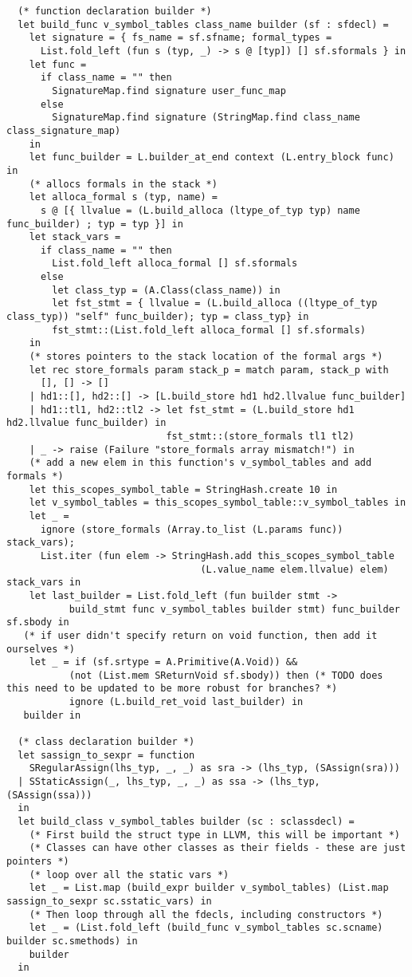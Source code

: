 \documentclass{article}
\begin{document}
\begin{verbatim}
  (* function declaration builder *)
  let build_func v_symbol_tables class_name builder (sf : sfdecl) =
    let signature = { fs_name = sf.sfname; formal_types =
      List.fold_left (fun s (typ, _) -> s @ [typ]) [] sf.sformals } in
    let func =
      if class_name = "" then
        SignatureMap.find signature user_func_map
      else
        SignatureMap.find signature (StringMap.find class_name class_signature_map)
    in
    let func_builder = L.builder_at_end context (L.entry_block func) in
    (* allocs formals in the stack *)
    let alloca_formal s (typ, name) = 
      s @ [{ llvalue = (L.build_alloca (ltype_of_typ typ) name func_builder) ; typ = typ }] in
    let stack_vars =
      if class_name = "" then
        List.fold_left alloca_formal [] sf.sformals
      else
        let class_typ = (A.Class(class_name)) in
        let fst_stmt = { llvalue = (L.build_alloca ((ltype_of_typ class_typ)) "self" func_builder); typ = class_typ} in
        fst_stmt::(List.fold_left alloca_formal [] sf.sformals)
    in
    (* stores pointers to the stack location of the formal args *)
    let rec store_formals param stack_p = match param, stack_p with
      [], [] -> []
    | hd1::[], hd2::[] -> [L.build_store hd1 hd2.llvalue func_builder]
    | hd1::tl1, hd2::tl2 -> let fst_stmt = (L.build_store hd1 hd2.llvalue func_builder) in
                            fst_stmt::(store_formals tl1 tl2)
    | _ -> raise (Failure "store_formals array mismatch!") in
    (* add a new elem in this function's v_symbol_tables and add formals *)
    let this_scopes_symbol_table = StringHash.create 10 in
    let v_symbol_tables = this_scopes_symbol_table::v_symbol_tables in
    let _ =
      ignore (store_formals (Array.to_list (L.params func)) stack_vars);
      List.iter (fun elem -> StringHash.add this_scopes_symbol_table
                                  (L.value_name elem.llvalue) elem) stack_vars in
    let last_builder = List.fold_left (fun builder stmt -> 
           build_stmt func v_symbol_tables builder stmt) func_builder sf.sbody in
   (* if user didn't specify return on void function, then add it ourselves *)
    let _ = if (sf.srtype = A.Primitive(A.Void)) &&
           (not (List.mem SReturnVoid sf.sbody)) then (* TODO does this need to be updated to be more robust for branches? *)
           ignore (L.build_ret_void last_builder) in
   builder in

  (* class declaration builder *)
  let sassign_to_sexpr = function
    SRegularAssign(lhs_typ, _, _) as sra -> (lhs_typ, (SAssign(sra)))
  | SStaticAssign(_, lhs_typ, _, _) as ssa -> (lhs_typ, (SAssign(ssa)))
  in
  let build_class v_symbol_tables builder (sc : sclassdecl) =
    (* First build the struct type in LLVM, this will be important *)
    (* Classes can have other classes as their fields - these are just pointers *)
    (* loop over all the static vars *)
    let _ = List.map (build_expr builder v_symbol_tables) (List.map sassign_to_sexpr sc.sstatic_vars) in
    (* Then loop through all the fdecls, including constructors *)
    let _ = (List.fold_left (build_func v_symbol_tables sc.scname) builder sc.smethods) in
    builder
  in
  

\end{verbatim}
\end{document}
